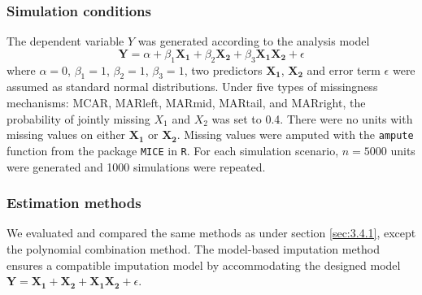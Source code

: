 	\subsubsection{Simulation conditions}
	The dependent variable $Y$ was generated according to the analysis model
	\begin{equation}
		\boldsymbol{Y} = \alpha+ \beta_1\boldsymbol{X_1} +  \beta_2\boldsymbol{X_2} + \beta_3\boldsymbol{X_1X_2} + \epsilon
	\end{equation}
	where $\alpha=0$, $\beta_1=1$, $\beta_2=1$, $\beta_3=1$, two predictors $\boldsymbol{X_1}$, $\boldsymbol{X_2}$ and error term $\epsilon$ were assumed as standard normal distributions. Under five types of missingness mechanisms: MCAR, MARleft, MARmid, MARtail, and MARright, the probability of jointly missing $X_1$ and $X_2$ was set to 0.4. There were no units with missing values on either $\boldsymbol{X_1}$ or $\boldsymbol{X_2}$. Missing values were amputed with the \texttt{ampute} function from the package \texttt{MICE} in \texttt{R}. For each simulation scenario, $n=5000$ units were generated and 1000 simulations were repeated.   
	
	\subsubsection{Estimation methods}
	We evaluated and compared the same methods as under section \ref{sec:3.4.1}, except the polynomial combination method. The model-based imputation method ensures a compatible imputation model by accommodating the designed model $\boldsymbol{Y} = \boldsymbol{X_1} + \boldsymbol{X_2} + \boldsymbol{X_1X_2} + \epsilon$. 
	
	
